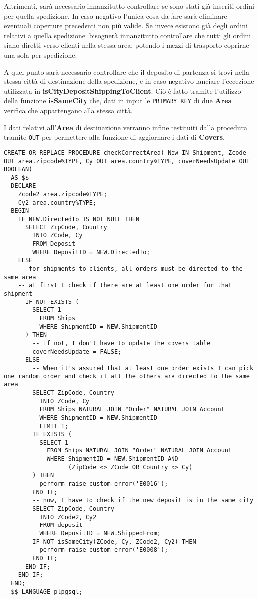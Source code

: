 Altrimenti, sarà necessario innanzitutto controllare se sono stati già inseriti ordini per quella spedizione. In caso negativo l'unica cosa da fare sarà eliminare eventuali coperture precedenti non più valide.
Se invece esistono già degli ordini relativi a quella spedizione, bisognerà innanzitutto controllare che tutti gli ordini siano diretti verso clienti nella stessa area, potendo i mezzi di trasporto coprirne una sola per spedizione.

A quel punto sarà necessario controllare che il deposito di partenza si trovi nella stessa città di destinazione della spedizione, e in caso negativo lanciare l'eccezione utilizzata in \textbf{isCityDepositShippingToClient}.
Ciò è fatto tramite l'utilizzo della funzione \textbf{isSameCity} che, dati in input le \lstinline{PRIMARY KEY} di due \textbf{Area} verifica che appartengano alla stessa città.

I dati relativi all'\textbf{Area} di destinazione verranno infine restituiti dalla procedura tramite \lstinline{OUT} per permettere alla funzione di aggiornare i dati di \textbf{Covers}.
\newpage
\begin{lstlisting}[caption={Procedure \textbf{checkCorrectArea}}]
  CREATE OR REPLACE PROCEDURE checkCorrectArea( New IN Shipment, Zcode OUT area.zipcode%TYPE, Cy OUT area.country%TYPE, coverNeedsUpdate OUT BOOLEAN)
  AS $$
  DECLARE
    Zcode2 area.zipcode%TYPE;
    Cy2 area.country%TYPE;
  BEGIN 
    IF NEW.DirectedTo IS NOT NULL THEN
      SELECT ZipCode, Country 
        INTO ZCode, Cy
        FROM Deposit
        WHERE DepositID = NEW.DirectedTo;
    ELSE
    -- for shipments to clients, all orders must be directed to the same area
    -- at first I check if there are at least one order for that shipment
      IF NOT EXISTS (
        SELECT 1
          FROM Ships 
          WHERE ShipmentID = NEW.ShipmentID
      ) THEN
        -- if not, I don't have to update the covers table
        coverNeedsUpdate = FALSE;
      ELSE
        -- When it's assured that at least one order exists I can pick one random order and check if all the others are directed to the same area
        SELECT ZipCode, Country 
          INTO ZCode, Cy
          FROM Ships NATURAL JOIN "Order" NATURAL JOIN Account
          WHERE ShipmentID = NEW.ShipmentID
          LIMIT 1;
        IF EXISTS (
          SELECT 1
            FROM Ships NATURAL JOIN "Order" NATURAL JOIN Account
            WHERE ShipmentID = NEW.ShipmentID AND
                  (ZipCode <> ZCode OR Country <> Cy)
        ) THEN
          perform raise_custom_error('E0016');
        END IF;
        -- now, I have to check if the new deposit is in the same city
        SELECT ZipCode, Country 
          INTO ZCode2, Cy2
          FROM deposit
          WHERE DepositID = NEW.ShippedFrom;
        IF NOT isSameCity(ZCode, Cy, ZCode2, Cy2) THEN
          perform raise_custom_error('E0008');
        END IF;
      END IF;
    END IF;
  END;
  $$ LANGUAGE plpgsql;
\end{lstlisting}

